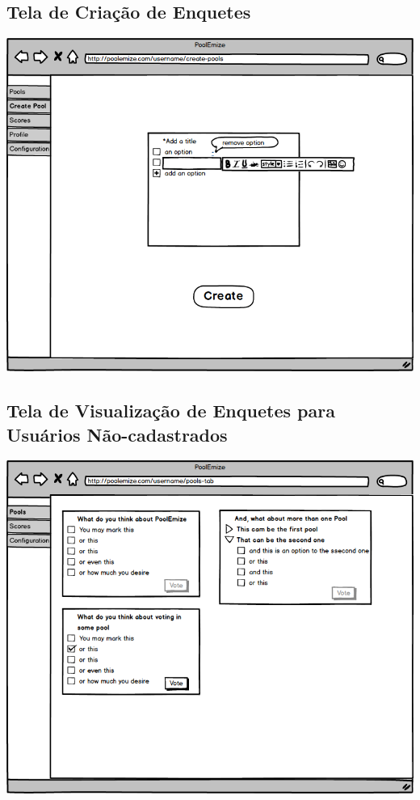 \documentclass[a4paper,12pt]{report}
\begin{document}
\subsection*{Tela de Criação de Enquetes}
\markright{}
\includegraphics[width=14.3cm]{mockups/CreatePoollsTab.png}
\subsection*{Tela de Visualização de Enquetes para Usuários Não-cadastrados}
\markright{}
\includegraphics[width=14.3cm]{mockups/GeneralPoollsScreenTab.png}
\end{document}
